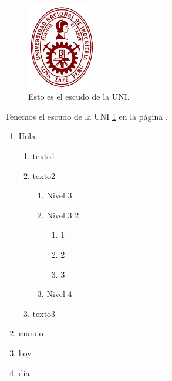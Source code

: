 \documentclass{article}
\begin{document}
\begin{figure}[H]
\centering
\includegraphics[width=3cm]{logo}
\caption[Escudo de la UNI]{Esto es el escudo de la UNI.}\label{fig:1}
\end{figure}

\listoffigures
\listoftables

Tenemos el escudo de la UNI \ref{fig:1} en la página \pageref{fig:1}.
\begin{enumerate}
	\item Hola
	\begin{enumerate}
		\item texto1
		\item texto2
		\begin{enumerate}
			\item Nivel 3
			\item Nivel 3 2
			\begin{enumerate}
				\item 1
				\item 2
				\item 3
			\end{enumerate}
			\item Nivel 4
		\end{enumerate}
		\item texto3
	\end{enumerate}
	\item mundo
	\item hoy
	\item día
\end{enumerate}
\end{document}
